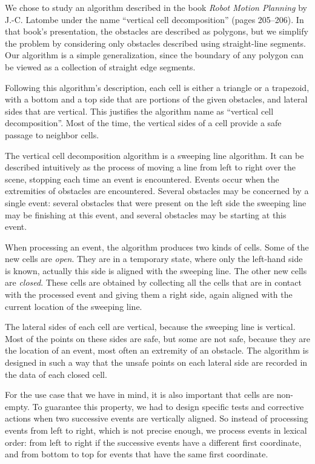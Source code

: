 \documentclass[a4paper, USenglish, cleveref, autoref, thm-restate, final]{lipics-v2021}
\begin{document}
We chose to study an algorithm described in the book {\em Robot Motion
 Planning} by J.-C. Latombe under the name ``vertical cell
decomposition'' \cite{Latombe91} (pages 205--206).  In that book's
presentation, the obstacles are
described as polygons, but we simplify the problem by
considering only obstacles described using straight-line segments.
Our algorithm is a simple generalization, since the boundary of
any polygon can be viewed as a collection of straight edge segments.

Following this algorithm's description, each cell is either a
triangle or a trapezoid, with a bottom and a top side that are
portions of the given obstacles, and lateral sides that are vertical.
This justifies the algorithm name as ``vertical cell decomposition''.
Most of the time, the vertical sides of a cell provide a safe passage
to neighbor cells.

The vertical cell decomposition algorithm is a sweeping line
algorithm. It can be described
intuitively as the process of moving a line from left to right over
the scene, stopping each time an event is encountered.
Events occur when the extremities of obstacles are encountered.
Several obstacles may be concerned by a single event: several
obstacles that were present on the left side the sweeping line may be
finishing at this event, and several obstacles may be starting at this
event.

When processing an event, the algorithm produces two kinds of cells.
Some of the new cells are {\em open}.  They are in a temporary state,
where only the left-hand side is known, actually this side is aligned
with the sweeping line.  The other new cells are {\em closed}.  These
cells are obtained by collecting all the cells that are in contact
with the processed event and giving them a right side, again aligned with
the current location of the sweeping line.

The lateral sides of each cell are vertical, because the sweeping line
is vertical.  Most of the points on these sides are safe, but
some are not safe,
because they are the location of an event, most often an extremity of an
obstacle.  The algorithm is designed in such a way that the unsafe
points on each lateral side are recorded in the data of each closed cell.

For the use case that we have in mind, it is also important that cells
are non-empty.  To guarantee this property, we had to design specific
tests and corrective actions when two successive events are vertically
aligned.  So instead of processing events from left to right, which is
not precise enough, we process events in lexical order: from left to
right if the successive events have a different first coordinate, and
from bottom to top for events that have the same first coordinate.
\end{document}
